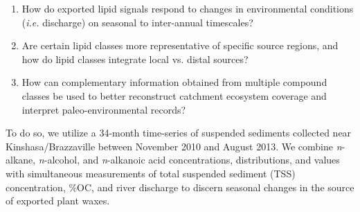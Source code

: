 \begin{enumerate}[label=(\textit{\roman*})]
%
\item How do exported lipid signals respond to changes in environmental conditions (\textit{i.e.} discharge) on seasonal to inter-annual timescales?
%
\item Are certain lipid classes more representative of specific source regions, and how do lipid classes integrate local vs. distal sources?
%
\item How can complementary information obtained from multiple compound classes be used to better reconstruct catchment ecosystem coverage and interpret paleo-environmental records?
%
\end{enumerate}

To do so, we utilize a 34-month time-series of suspended sediments collected near Kinshasa/Brazzaville between November 2010 and August 2013.  We combine \textit{n}-alkane, \textit{n}-alcohol, and \textit{n}-alkanoic acid concentrations, distributions, and  values with simultaneous measurements of total suspended sediment (TSS) concentration, \%OC, and river discharge to discern seasonal changes in the source of exported plant waxes. 


